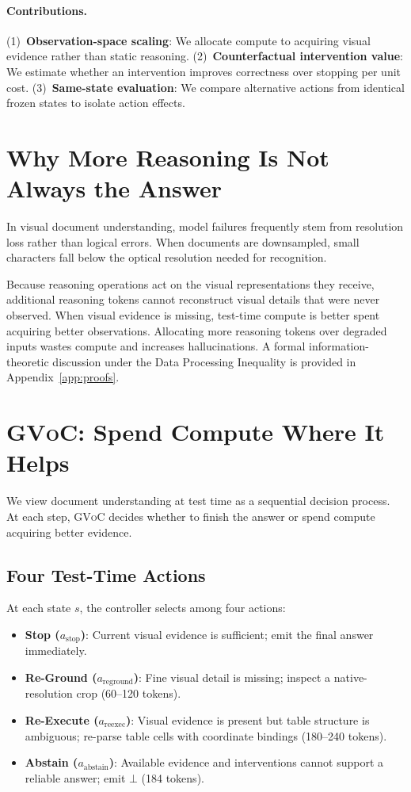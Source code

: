 \documentclass[11pt]{article}
\begin{document}
\paragraph{Contributions.}
(1)~\textbf{Observation-space scaling}: We allocate compute to acquiring visual evidence rather than static reasoning.
(2)~\textbf{Counterfactual intervention value}: We estimate whether an intervention improves correctness over stopping per unit cost.
(3)~\textbf{Same-state evaluation}: We compare alternative actions from identical frozen states to isolate action effects.

\section{Why More Reasoning Is Not Always the Answer}
\label{sec:why_not_reasoning}

In visual document understanding, model failures frequently stem from resolution loss rather than logical errors. When documents are downsampled, small characters fall below the optical resolution needed for recognition.

Because reasoning operations act on the visual representations they receive, additional reasoning tokens cannot reconstruct visual details that were never observed. When visual evidence is missing, test-time compute is better spent acquiring better observations. Allocating more reasoning tokens over degraded inputs wastes compute and increases hallucinations. A formal information-theoretic discussion under the Data Processing Inequality is provided in Appendix~\ref{app:proofs}.

\section{\textsc{GVoC}: Spend Compute Where It Helps}
\label{sec:method}

We view document understanding at test time as a sequential decision process. At each step, \textsc{GVoC} decides whether to finish the answer or spend compute acquiring better evidence.

\subsection{Four Test-Time Actions}
At each state $s$, the controller selects among four actions:
\begin{itemize}[leftmargin=*,itemsep=1pt,topsep=1pt]
\item \textbf{Stop ($a_{\text{stop}}$)}: Current visual evidence is sufficient; emit the final answer immediately.
\item \textbf{Re-Ground ($a_{\text{reground}}$)}: Fine visual detail is missing; inspect a native-resolution crop (60--120 tokens).
\item \textbf{Re-Execute ($a_{\text{reexec}}$)}: Visual evidence is present but table structure is ambiguous; re-parse table cells with coordinate bindings (180--240 tokens).
\item \textbf{Abstain ($a_{\text{abstain}}$)}: Available evidence and interventions cannot support a reliable answer; emit $\bot$ (184 tokens).
\end{itemize}
\end{document}
